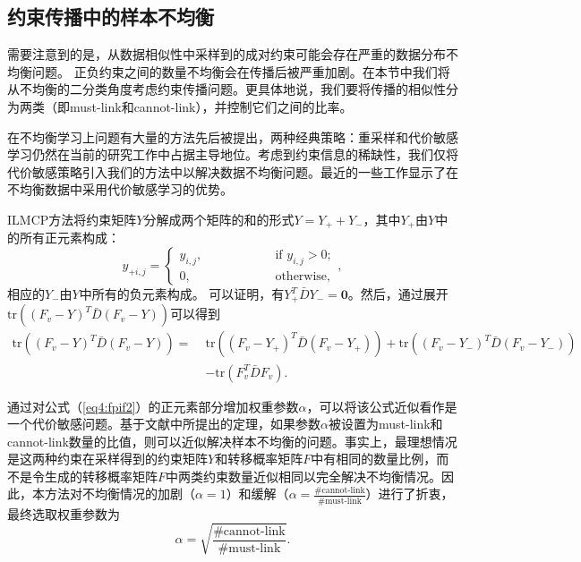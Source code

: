 \subsection{约束传播中的样本不均衡}
需要注意到的是，从数据相似性中采样到的成对约束可能会存在严重的数据分布不均衡问题。 正负约束之间的数量不均衡会在传播后被严重加剧。在本节中我们将从不均衡的二分类角度考虑约束传播问题。更具体地说，我们要将传播的相似性分为两类（即must-link和cannot-link），并控制它们之间的比率。

在不均衡学习上问题有大量的方法先后被提出，两种经典策略：重采样和代价敏感学习仍然在当前的研究工作中占据主导地位\cite{he2009learning,huang2016learning}。考虑到约束信息的稀缺性，我们仅将代价敏感策略引入我们的方法中以解决数据不均衡问题。最近的一些工作显示了在不均衡数据中采用代价敏感学习的优势\cite{shi2000normalized,DBLP:journals/corr/KhanBST15}。

ILMCP方法将约束矩阵$Y$分解成两个矩阵的和的形式${Y} = {Y}_++{Y}_-$，其中${Y}_+$由$Y$中的所有正元素构成：
\begin{equation}
{y}_{+i,j} = 
\begin{cases}
y_{i,j},\quad\qquad\qquad&\text{if }y_{i,j}>0;\\ 0,&\text{otherwise,}
\end{cases},
\end{equation}
相应的${Y}_-$由$Y$中所有的负元素构成。
可以证明，有${Y}_+^T{\bar{{D}} Y}_- = \mathbf{0}$。然后，通过展开 $ \mathrm{tr}(({F}_v - {Y} )^T{\bar{D}}({F}_v - {Y})) $可以得到
\begin{equation}
\begin{split}
\mathrm{tr}((F_v - Y )^T\bar{D}(F_v - Y))=\;&\mathrm{tr}(({F}_v-{Y}_+)^T{\bar{D}}({F}_v-{Y}_+))+\mathrm{tr}(({F}_v-{Y}_-)^T{\bar{D}}({F}_v-{Y}_-))\\
&-\mathrm{tr}({F}_v^T{\bar{D} F}_v). 
\end{split}
\label{eq4:fpif2}
\end{equation}

通过对公式（\ref{eq4:fpif2}）的正元素部分增加权重参数$\alpha$，可以将该公式近似看作是一个代价敏感问题。基于文献\parencite{elkan2001foundations}中所提出的定理，如果参数$\alpha$被设置为must-link和cannot-link数量的比值，则可以近似解决样本不均衡的问题。事实上，最理想情况是这两种约束在采样得到的约束矩阵$Y$和转移概率矩阵$F$中有相同的数量比例，而不是令生成的转移概率矩阵$F$中两类约束数量近似相同以完全解决不均衡情况。因此，本方法对不均衡情况的加剧（$\alpha=1$）和缓解（$\alpha= \frac{\#\text{cannot-link}}{\#\text{must-link}}$）进行了折衷，最终选取权重参数为
\begin{equation}
    \alpha = \sqrt{\frac{\#\text{cannot-link}}{\#\text{must-link}}}.
\end{equation}

